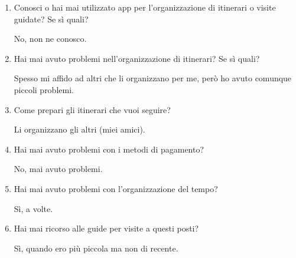 \clearpage
{}

\begin{enumerate}

\item Conosci o hai mai utilizzato app per l'organizzazione di itinerari o visite guidate? Se sì quali?

No, non ne conosco.

\item Hai mai avuto problemi nell'organizzazione di itinerari? Se sì quali?

Spesso mi affido ad altri che li organizzano per me, però ho avuto comunque piccoli problemi.

\item Come prepari gli itinerari che vuoi seguire?

Li organizzano gli altri (miei amici).

\item Hai mai avuto problemi con i metodi di pagamento?

No, mai avuto problemi.

\item Hai mai avuto problemi con l'organizzazione del tempo?

Sì, a volte.

\item Hai mai ricorso alle guide per visite a questi posti?

Sì, quando ero più piccola ma non di recente.

\end{enumerate}

\clearpage
{}

